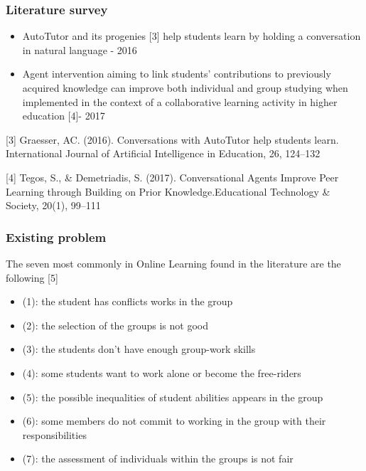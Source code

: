 \documentclass{beamer}
\begin{document}
\begin{frame}
\frametitle{Literature survey}
\begin{itemize}
\item AutoTutor and its progenies [3] help students learn by holding a conversation in natural language - 2016
\item Agent intervention aiming to link students' contributions to previously acquired knowledge can improve both individual and group studying when implemented in the context of a collaborative learning activity in higher education [4]- 2017
\end{itemize}
\begin{thebibliography}{01}
{\tiny 

 [3]	Graesser, AC. (2016). Conversations with AutoTutor help students learn.
International Journal of Artificial Intelligence in Education, 26, 124–132	

 [4] Tegos,  S.,  \&  Demetriadis,  S.  (2017). Conversational  Agents  Improve Peer  Learning  through  Building  on Prior  Knowledge.Educational Technology \& Society, 20(1), 99–111}
\end{thebibliography}
\end{frame}
\begin{frame}
\frametitle{ Existing problem}
The seven most commonly in Online Learning found in the literature are the following [5]
{\footnotesize \begin{itemize}
		\item (1): the student has conflicts works in the group
		\item (2): the selection of the groups is not good
		\item (3): the students don't have enough group-work skills
		\item (4):  some students want to work alone or become the free-riders
		\item (5):  the possible inequalities of student abilities appears in the group
		\item (6):  some members do not commit to working in the group with their responsibilities
		\item (7): the assessment of individuals within the groups is not fair
\end{itemize}}
\begin{thebibliography}{01}
\end{thebibliography}


\end{frame}
\end{document}
